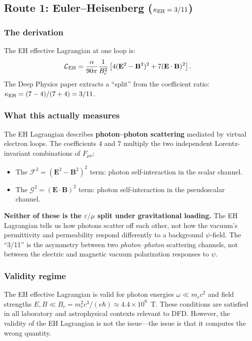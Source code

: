 \documentclass[11pt,a4paper]{article}
\newcommand{\vE}{\mathbf{E}}
\newcommand{\vB}{\mathbf{B}}
\begin{document}
\subsection{Route 1: Euler--Heisenberg ($\kappa_{\rm EH} = 3/11$)}

\subsubsection{The derivation}

The EH effective Lagrangian at one loop is:
\begin{equation}
\mathcal{L}_{\rm EH} = \frac{\alpha}{90\pi}\frac{1}{B_c^2}
\left[4(\vE^2 - \vB^2)^2 + 7(\vE\cdot\vB)^2\right].
\end{equation}
The Deep Physics paper extracts a ``split'' from the coefficient ratio:
$\kappa_{\rm EH} = (7-4)/(7+4) = 3/11$.

\subsubsection{What this actually measures}

The EH Lagrangian describes \textbf{photon--photon scattering} mediated by
virtual electron loops.  The coefficients $4$ and $7$ multiply the two
independent Lorentz-invariant combinations of $F_{\mu\nu}$:
\begin{itemize}
\item The $\mathcal{F}^2 = (\vE^2 - \vB^2)^2$ term: photon self-interaction
  in the scalar channel.
\item The $\mathcal{G}^2 = (\vE\cdot\vB)^2$ term: photon self-interaction
  in the pseudoscalar channel.
\end{itemize}

\textbf{Neither of these is the $\varepsilon/\mu$ split under gravitational
loading.}  The EH Lagrangian tells us how photons scatter off each other,
not how the vacuum's permittivity and permeability respond differently to a
background $\psi$-field.  The ``3/11'' is the asymmetry between two
\emph{photon--photon} scattering channels, not between the electric and
magnetic vacuum polarization responses to $\psi$.

\subsubsection{Validity regime}

The EH effective Lagrangian is valid for photon energies
$\omega \ll m_e c^2$ and field strengths $E, B \ll B_c = m_e^2 c^3/(e\hbar)
\approx 4.4 \times 10^9$~T.  These conditions are satisfied in all
laboratory and astrophysical contexts relevant to DFD.  However, the
validity of the EH Lagrangian is not the issue---the issue is that it
computes the wrong quantity.
\end{document}
